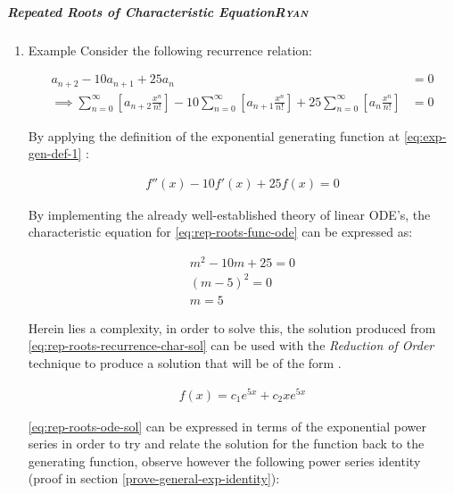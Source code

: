 \documentclass[a4paper,11pt,twoside]{article}
\begin{document}
\subparagraph{Repeated Roots of Characteristic Equation\hfill{}\textsc{Ryan}}
\label{rep-roots-recurrence}
\begin{enumerate}
\item Example
\label{sec:org25dd90c}
Consider the following recurrence relation:

\begin{align}
    a_{n+2} -  10a_{n+ 1} +  25a_{n}&= 0 \label{eq:hom-repeated-roots-recurrence} \\
    \implies  \sum^{\infty}_{n= 0}   {\left[{ a_{n+2} \frac{x^n}{n!} }\right]} - 10 \sum^{\infty}_{n= 0}   {\left[{ a_{n+1} \frac{x^n}{n!}    }\right]} + 25 \sum^{\infty}_{n= 0 }   {\left[{  a_{n}\frac{x^n}{n!} }\right]}&= 0 \nonumber
\end{align}

By applying the definition of the exponential generating function at \eqref{eq:exp-gen-def-1} :

\begin{align}
    f''{\left({ x }\right)}- 10f'{\left({ x }\right)}+  25f{\left({ x }\right)}= 0 \label{eq:rep-roots-func-ode}
\end{align}

By implementing the already well-established theory of linear ODE's, the
characteristic equation for \eqref{eq:rep-roots-func-ode} can be expressed as:

\begin{align}
    m^2- 10m+  25 = 0 \nonumber \\
    {\left({ m- 5 }\right)}^2 = 0 \nonumber \\
    m= 5 \label{eq:rep-roots-recurrence-char-sol}
\end{align}

Herein lies a complexity, in order to solve this, the solution produced from \eqref{eq:rep-roots-recurrence-char-sol} can be used with the \emph{Reduction of Order} technique to produce a solution that will be of the form \cite[]{zillMatrixExponential2009}.

\begin{align}
    f{\left({ x }\right)}= c_1e^{5x} +  c_2 x e^{5x} \label{eq:rep-roots-ode-sol}
\end{align}

\eqref{eq:rep-roots-ode-sol} can be expressed in terms of the exponential power series in order to try and relate the solution for the function back to the generating function,
observe however the following power series identity (proof in section \ref{prove-general-exp-identity}):


\end{enumerate}
\end{document}
